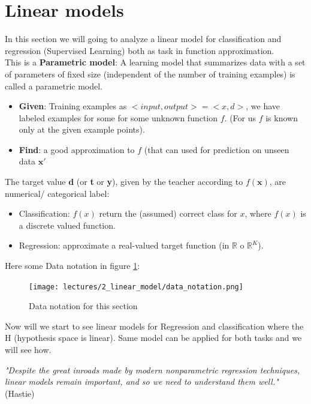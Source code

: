 \documentclass[../main.tex]{subfiles}
\begin{document}
\section{Linear models}
In this section we will going to analyze a linear model for classification and regression (Supervised Learning) both as task in function approximation. \\

This is a \textbf{Parametric model}: A learning model that summarizes data with a set of parameters of fixed size (independent of the number of training examples) is called a parametric model.
\begin{itemize}
    \item \textbf{Given}: Training examples as $<input,output>=<x,d>$, we have labeled examples for some for some unknown function $f$. (For us $f$ is known only at the given example points).
    
    \item \textbf{Find}: a good approximation to $f$ (that can used for prediction on unseen data $\mathbf{x}'$
\end{itemize}

The target value \textbf{d} (or \textbf{t} or \textbf{y}), given by the teacher according to $f(\textbf{x})$, are numerical/ categorical label:
\begin{itemize}
    \item Classification: $f(x)$ return the (assumed) correct class for $x$, where $f(x)$ is a discrete valued function.
    
    \item Regression:  approximate a real-valued target function (in $\mathbb{R}$ o $\mathbb{R}^K$).
\end{itemize}

Here some Data notation in figure \ref{fig:data_notation}:
\begin{figure}[H]
    \centering
    \texttt{[image: lectures/2\_linear\_model/data\_notation.png]}
    \caption{Data notation for this section}
    \label{fig:data_notation}
\end{figure}

Now will we start to see linear models for Regression and classification where the H (hypothesis space is linear). Same model can be applied for both tasks and we will see how.\\

\begin{flushright}
\textit{"Despite the great inroads made by modern nonparametric regression techniques, linear models remain important, and so we need to understand them well."} (Hastie)\\
\end{flushright}
\end{document}
